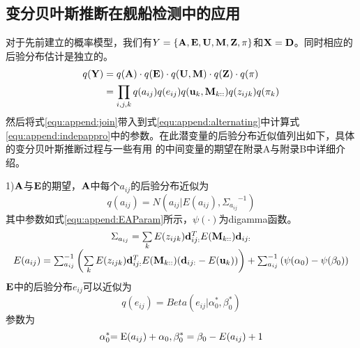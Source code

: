 \subsection{变分贝叶斯推断在舰船检测中的应用}
对于先前建立的概率模型，我们有$Y = \{ {\bf{A,E,U,M,Z}},\pi \}$和${\bf{X = D}}$。同时相应的后验分布估计是独立的。
\begin{equation}
    \begin{aligned}
    \label{equ:append:indepappro}
        q({\bf{Y}}) &= q({\bf{A}}) \cdot q({\bf{E}}) \cdot q({\bf{U,M}}) \cdot q({\bf{Z}}) \cdot q(\pi )\\
        & = \prod\limits_{i,j,k} {q({a_{ij}})q({e_{ij}})q({{\bf{u}}_k},{{\bf{M}}_{k::}})q({z_{ijk}})q({\pi _k})} 
    \end{aligned}
\end{equation}
然后将式\ref{equ:append:join}带入到式\ref{equ:append:alternating}中计算式\ref{equ:append:indepappro}中的参数。在此潜变量的后验分布近似值列出如下，具体的变分贝叶斯推断过程与一些有用
的中间变量的期望在附录A与附录B中详细介绍。

1)$\bf{A}$与$\bf{E}$的期望，$\bf{A}$中每个$a_{ij}$的后验分布近似为
\begin{equation}
    \label{equ:append:EA}
    q({a_{ij}}) = N({a_{ij}}|E({a_{ij}}),{\Sigma _{{a_{ij}}}}^{ - 1})
\end{equation}
其中参数如式\ref{equ:append:EAParam}所示，$\psi(\cdot)$为digamma函数。
\begin{equation}
    \label{equ:append:EAParam}
        \begin{array}{*{20}{c}}
        {{\Sigma _{{a_{ij}}}} = \sum\limits_k {E({z_{ijk}}){\bf{d}}_{ij:}^TE({{\bf{M}}_{k::}}){{\bf{d}}_{ij:}}} }\\
        {E({a_{ij}}) = \sum\nolimits_{{a_{ij}}}^{ - 1} {\left( {\sum\limits_k {E({z_{ijk}}){\bf{d}}_{ij:}^TE({{\bf{M}}_{k::}})({{\bf{d}}_{ij:}} - E({{\bf{u}}_k}))} } \right) + \sum\nolimits_{{a_{ij}}}^{ - 1} {(\psi ({\alpha _0}) - \psi ({\beta _0}))} } }
        \end{array}
\end{equation}
$\bf{E}$中的后验分布$e_{ij}$可以近似为
\begin{equation}
    \label{equ:append:EE}
    q({e_{ij}}) = Beta({e_{ij}}|\alpha _0^*,\beta _0^*)
\end{equation}
参数为
\begin{equation}
    \label{equ:append:EEParam}
    \alpha _0^*{\rm{ = E}}({a_{ij}}) + {\alpha _0},\beta _0^* = {\beta _0} - E({a_{ij}}) + 1
\end{equation}

